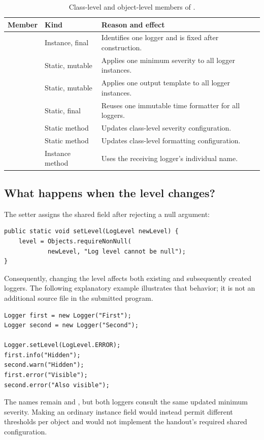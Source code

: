 \begin{table}[H]
\centering\small
\begin{tabularx}{\textwidth}{@{}p{}p{}Y@{}}
\toprule
\textbf{Member} & \textbf{Kind} & \textbf{Reason and effect}\\
\midrule
{} & Instance, final & Identifies one logger and is fixed after construction.\\
 & Static, mutable & Applies one minimum severity to all logger instances.\\
 & Static, mutable & Applies one output template to all logger instances.\\
 & Static, final & Reuses one immutable time formatter for all loggers.\\
 & Static method & Updates class-level severity configuration.\\
 & Static method & Updates class-level formatting configuration.\\
 & Instance method & Uses the receiving logger's individual name.\\
\bottomrule
\end{tabularx}
\caption{Class-level and object-level members of .}
\end{table}

\begin{samepage}
\begin{samepage}
\subsection{What happens when the level changes?}
The setter assigns the shared field after rejecting a null argument:
\begin{lstlisting}
public static void setLevel(LogLevel newLevel) {
    level = Objects.requireNonNull(
            newLevel, "Log level cannot be null");
}
\end{lstlisting}
\end{samepage}
Consequently, changing the level affects both existing and subsequently created loggers. The following explanatory example illustrates that behavior; it is not an additional source file in the submitted program.
\begin{lstlisting}
Logger first = new Logger("First");
Logger second = new Logger("Second");

Logger.setLevel(LogLevel.ERROR);
first.info("Hidden");
second.warn("Hidden");
first.error("Visible");
second.error("Also visible");
\end{lstlisting}
\end{samepage}
The names remain  and , but both loggers consult the same updated minimum severity. Making  an ordinary instance field would instead permit different thresholds per object and would not implement the handout's required shared configuration.

